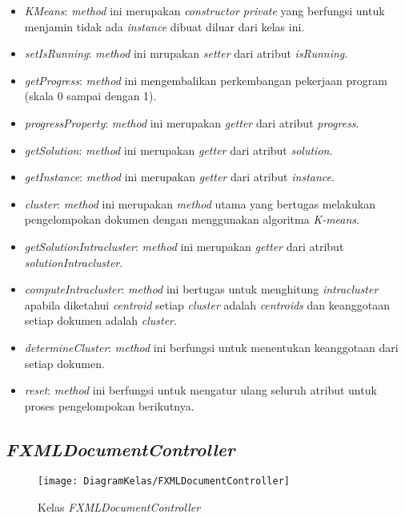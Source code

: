 \begin{itemize}
	\item \textit{KMeans}: \textit{method} ini merupakan \textit{constructor private} yang berfungsi untuk menjamin tidak ada \textit{instance} dibuat diluar dari kelas ini.
	\item \textit{setIsRunning}: \textit{method} ini mrupakan \textit{setter} dari atribut \textit{isRunning}.
	\item \textit{getProgress}: \textit{method} ini mengembalikan perkembangan pekerjaan program (skala 0 sampai dengan 1).
	\item \textit{progressProperty}: \textit{method} ini merupakan \textit{getter} dari atribut \textit{progress}.
	\item \textit{getSolution}: \textit{method} ini merupakan \textit{getter} dari atribut \textit{solution}.
	\item \textit{getInstance}: \textit{method} ini merupakan \textit{getter} dari atribut \textit{instance}.
	\item \textit{cluster}: \textit{method} ini merupakan \textit{method} utama yang bertugas melakukan pengelompokan dokumen dengan menggunakan algoritma \textit{K-means}.
	\item \textit{getSolutionIntracluster}: \textit{method} ini merupakan \textit{getter} dari atribut \textit{solutionIntracluster}.
	\item \textit{computeIntracluster}: \textit{method} ini bertugas untuk menghitung \textit{intracluster} apabila diketahui \textit{centroid} setiap \textit{cluster} adalah \textit{centroids} dan keanggotaan setiap dokumen adalah \textit{cluster}.
	\item \textit{determineCluster}: \textit{method} ini berfungsi untuk menentukan keanggotaan dari setiap dokumen.
	\item \textit{reset}: \textit{method} ini berfungsi untuk mengatur ulang seluruh atribut untuk proses pengelompokan berikutnya.
\end{itemize}

\subsection{\textit{FXMLDocumentController}}

\begin{figure}[H]
	\begin{center}
		\texttt{[image: DiagramKelas/FXMLDocumentController]}
		\caption{Kelas \textit{FXMLDocumentController}}
		\label{fig:kelasFXMLDocumentController}
	\end{center}
\end{figure}

